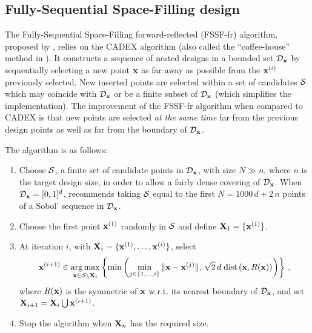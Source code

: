 \subsection{Fully-Sequential Space-Filling design}\label{sec:FSSF}

The Fully-Sequential Space-Filling forward-reflected (FSSF-fr) algorithm, proposed by \citet{shang_apley_2020}, relies on the CADEX algorithm \citep{kensto69} (also called the ``coffee-house'' method in \citealp{mul07}). 
It constructs a sequence of nested designs in a bounded set $\mathcal{D}_{\bf x}$ by sequentially selecting a new point ${\bf x}$ as far away as possible from the ${\bf x}^{(i)}$ previously selected. 
New inserted points are selected within a set of candidates $\mathcal{S}$ which may coincide with $\mathcal{D}_{\bf x}$ or be a finite subset of $\mathcal{D}_{\bf x}$ (which simplifies the implementation). 
The improvement of the FSSF-fr algorithm when compared to CADEX is that new points are selected {\em at the same time} far from the previous design points as well as far from the boundary of $\mathcal{D}_{\bf x}$. 

The algorithm is as follows:
\begin{enumerate}
  \item Choose $\mathcal{S}$, a finite set of candidate points in $\mathcal{D}_{\bf x}$, with size $N \gg n$, where $n$ is the target design size, in order to allow a fairly dense covering of $\mathcal{D}_{\bf x}$. 
  When $\mathcal{D}_{\bf x}=[0,1]^d$, \citet{shang_apley_2020} recommends taking $\mathcal{S}$ equal to the first $N=1000\,d+2\,n$ points of a Sobol' sequence in $\mathcal{D}_{\bf x}$. 
  
  \item Choose the first point ${\bf x}^{(1)}$ randomly in $\mathcal{S}$ and define ${\bf X}_1 = \{{\bf x}^{(1)}\}$. 
  
  \item At iteration $i$, with ${\bf X}_i = \{{\bf x}^{(1)},\ldots, {\bf x}^{(i)}\}$, select
  \begin{equation}\label{eq:FSSF-fr}
    {\bf x}^{(i+1)} \in \operatorname*{arg\,max}_{{\bf x} \in \mathcal{S} \setminus {\bf X}_i} \left\{ \min\left( \min_{j \in \{1,\ldots,i\}} \|{\bf x}-{\bf x}^{(j)}\|, \, \sqrt{2}\,d \; \mbox{dist}\left({\bf x},R({\bf x})\right) \right) \right\}\,, 
  \end{equation}
  where $R({\bf x})$ is the symmetric of ${\bf x}$ w.r.t. its nearest boundary of $\mathcal{D}_{\bf x}$,
  and set ${\bf X}_{i+1} = {\bf X}_i \bigcup {\bf x}^{(i+1)}$.
  
  \item Stop the algorithm when ${\bf X}_n$ has the required size.
\end{enumerate}

